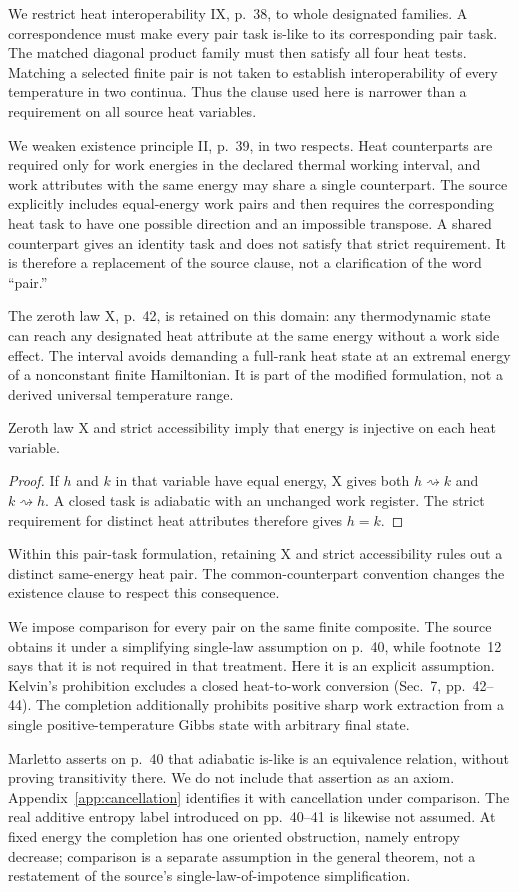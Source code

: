 We restrict heat interoperability IX, p.~38, to whole designated families. A correspondence must make every pair task is-like to its corresponding pair task. The matched diagonal product family must then satisfy all four heat tests. Matching a selected finite pair is not taken to establish interoperability of every temperature in two continua. Thus the clause used here is narrower than a requirement on all source heat variables.

We weaken existence principle II, p.~39, in two respects. Heat counterparts are required only for work energies in the declared thermal working interval, and work attributes with the same energy may share a single counterpart. The source explicitly includes equal-energy work pairs and then requires the corresponding heat task to have one possible direction and an impossible transpose. A shared counterpart gives an identity task and does not satisfy that strict requirement. It is therefore a replacement of the source clause, not a clarification of the word ``pair.''

The zeroth law X, p.~42, is retained on this domain: any thermodynamic state can reach any designated heat attribute at the same energy without a work side effect. The interval avoids demanding a full-rank heat state at an extremal energy of a nonconstant finite Hamiltonian. It is part of the modified formulation, not a derived universal temperature range.

\begin{lemma}\label{lem:injectivity}
Zeroth law X and strict accessibility imply that energy is injective on each heat variable.
\end{lemma}
\begin{proof}
If $h$ and $k$ in that variable have equal energy, X gives both $h\rightsquigarrow k$ and $k\rightsquigarrow h$. A closed task is adiabatic with an unchanged work register. The strict requirement for distinct heat attributes therefore gives $h=k$.
\end{proof}
Within this pair-task formulation, retaining X and strict accessibility rules out a distinct same-energy heat pair. The common-counterpart convention changes the existence clause to respect this consequence.

We impose comparison for every pair on the same finite composite. The source obtains it under a simplifying single-law assumption on p.~40, while footnote~12 says that it is not required in that treatment. Here it is an explicit assumption. Kelvin's prohibition excludes a closed heat-to-work conversion (Sec.~7, pp.~42--44). The completion additionally prohibits positive sharp work extraction from a single positive-temperature Gibbs state with arbitrary final state.

Marletto asserts on p.~40 that adiabatic is-like is an equivalence relation, without proving transitivity there. We do not include that assertion as an axiom. Appendix~\ref{app:cancellation} identifies it with cancellation under comparison. The real additive entropy label introduced on pp.~40--41 is likewise not assumed. At fixed energy the completion has one oriented obstruction, namely entropy decrease; comparison is a separate assumption in the general theorem, not a restatement of the source's single-law-of-impotence simplification.
